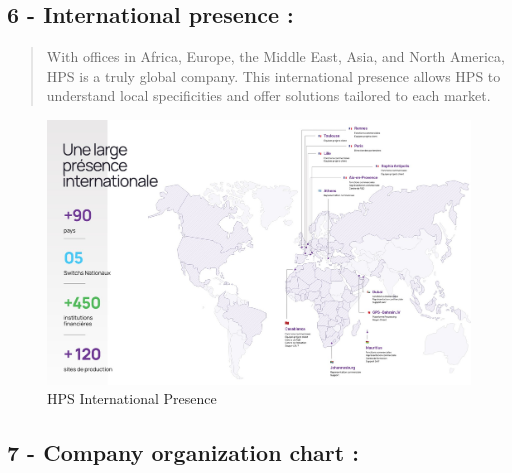 \documentclass[12pt,a4paper]{report}
\begin{document}
\subsection{6 - International presence :}

\begin{quote}
With offices in Africa, Europe, the Middle East, Asia, and North America, HPS is a truly global company. This international presence allows HPS to understand local specificities and offer solutions tailored to each market.
\end{quote}

\begin{figure}[H]
\centering
\includegraphics[width=6in]{media/image23.jpeg}
\caption{HPS International Presence}
\label{fig:intlPresence}
\end{figure}

\subsection{7 - Company organization chart :}
\end{document}
